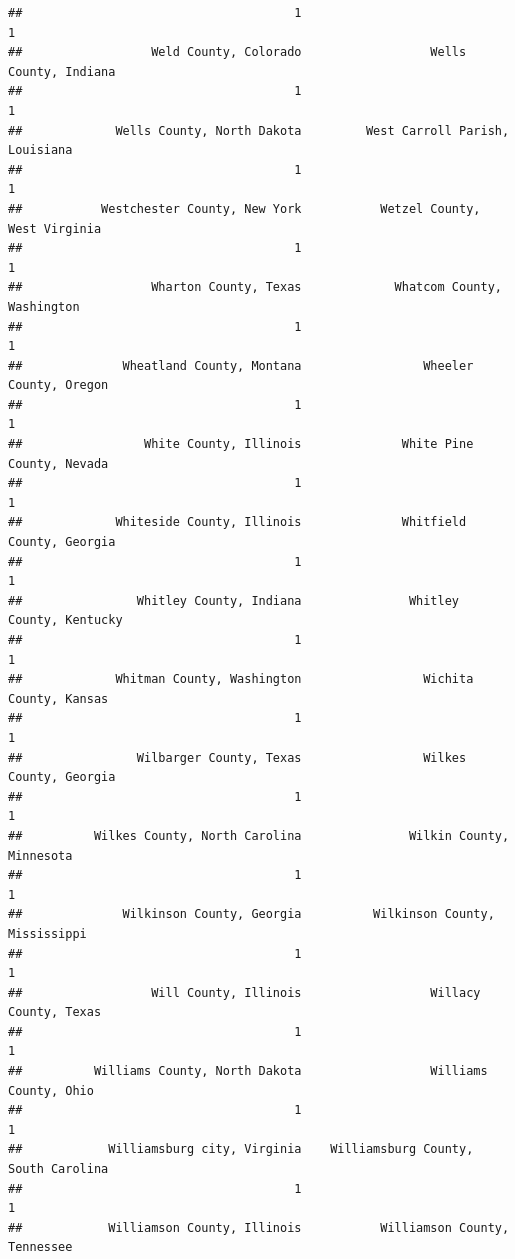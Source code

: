 \documentclass[
]{article}
\begin{document}
\begin{verbatim}
##                                      1                                      1 
##                  Weld County, Colorado                  Wells County, Indiana 
##                                      1                                      1 
##             Wells County, North Dakota         West Carroll Parish, Louisiana 
##                                      1                                      1 
##           Westchester County, New York           Wetzel County, West Virginia 
##                                      1                                      1 
##                  Wharton County, Texas             Whatcom County, Washington 
##                                      1                                      1 
##              Wheatland County, Montana                 Wheeler County, Oregon 
##                                      1                                      1 
##                 White County, Illinois              White Pine County, Nevada 
##                                      1                                      1 
##             Whiteside County, Illinois              Whitfield County, Georgia 
##                                      1                                      1 
##                Whitley County, Indiana               Whitley County, Kentucky 
##                                      1                                      1 
##             Whitman County, Washington                 Wichita County, Kansas 
##                                      1                                      1 
##                Wilbarger County, Texas                 Wilkes County, Georgia 
##                                      1                                      1 
##          Wilkes County, North Carolina               Wilkin County, Minnesota 
##                                      1                                      1 
##              Wilkinson County, Georgia          Wilkinson County, Mississippi 
##                                      1                                      1 
##                  Will County, Illinois                  Willacy County, Texas 
##                                      1                                      1 
##          Williams County, North Dakota                  Williams County, Ohio 
##                                      1                                      1 
##            Williamsburg city, Virginia    Williamsburg County, South Carolina 
##                                      1                                      1 
##            Williamson County, Illinois           Williamson County, Tennessee 

\end{verbatim}
\end{document}
